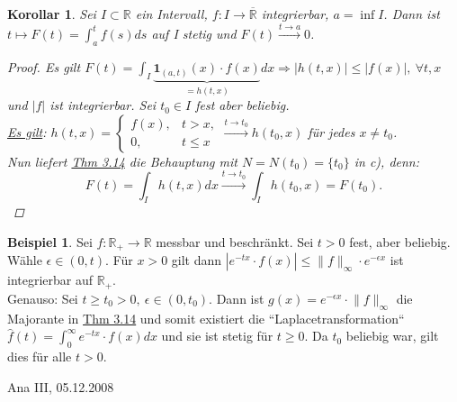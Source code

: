 \documentclass[a4paper]{report}
\newcommand{\doubleOne}{\textbf{1}}
\newcommand{\R}{\mathbb{R}}
\newcommand{\Rq}{\overline{\R}}
\newcommand{\jlabel}[1]{\label{j_#1}}
\newcommand{\jhyperref}[2]{\hyperref[j_#1]{#2}}
\newcommand{\jlink}[1]{\jhyperref{#1}{#1}}
\newcommand{\jabb}[3]{ #1: #2 \rightarrow #3 }
\newcommand{\jspacesmall}{\vspace{4pt}}
\newcommand{\jdate}[1]{\jspacesmall\begin{center}\jlabel{#1}\tiny{Ana III, #1}\end{center}}
\theoremstyle{plain}
\newtheorem{kor}[thm]{Korollar}
\theoremstyle{definition}
\newtheorem*{expl*}{Beispiel}
\begin{document}
{{{{\begin{kor}
\jlabel{Kor 3.15}
    Sei $I \subset \R$ ein Intervall, $\jabb{f}{I}{\Rq}$ integrierbar, $a=\inf I$. Dann ist $t\mapsto F(t) = \int_a^t f(s)ds$ auf I stetig und $F(t) \xrightarrow{t \rightarrow a} 0$.
    \begin{proof}
        Es gilt $F(t) = \int_I \underbrace{\doubleOne_{(a,t)}(x) \cdot f(x)}_{=h(t,x)} dx \Rightarrow |h(t,x)| \le |f(x)|, \ \forall t,x$ und $|f|$ ist integrierbar. Sei $t_0 \in I$ fest aber beliebig.\\
        \uline{Es gilt}: $h(t,x) = \begin{cases} f(x), & t > x, \\ 0, & t \le x \end{cases} \xrightarrow{t \rightarrow t_0} h(t_0,x)$ für jedes $x \ne t_0$.\\
        Nun liefert \jlink{Thm 3.14} die Behauptung mit $N=N(t_0)=\{t_0\}$ in c), denn:
        \begin{displaymath}
            F(t) = \int_I h(t,x) dx \xrightarrow{t\rightarrow t_0} \int_I h(t_0,x) = F(t_0).
        \end{displaymath}
    \end{proof}
\end{kor}

\begin{expl*}
    Sei $\jabb{f}{\R_+}{\R}$ messbar und beschränkt. Sei $t>0$ fest, aber beliebig. Wähle $\epsilon \in (0,t)$. Für $x>0$ gilt dann $|e^{-tx}\cdot f(x)| \le \lVert f \rVert_\infty \cdot e^{-\epsilon x}$ ist integrierbar auf $\R_+$.\\
    Genauso: Sei $t\ge t_0 > 0, \ \epsilon \in (0,t_0)$. Dann ist $g(x) = e^{-\epsilon x}\cdot \lVert f \rVert_\infty$ die Majorante in \jlink{Thm 3.14} und somit existiert die ``Laplacetransformation``\\
    $\hat{f}(t) = \int_0^\infty e^{-tx}\cdot f(x) dx$ und sie ist stetig für $t\ge 0$. Da $t_0$ beliebig war, gilt dies für alle $t>0$.
\end{expl*}


\jdate{05.12.2008}

}}}}
\end{document}
